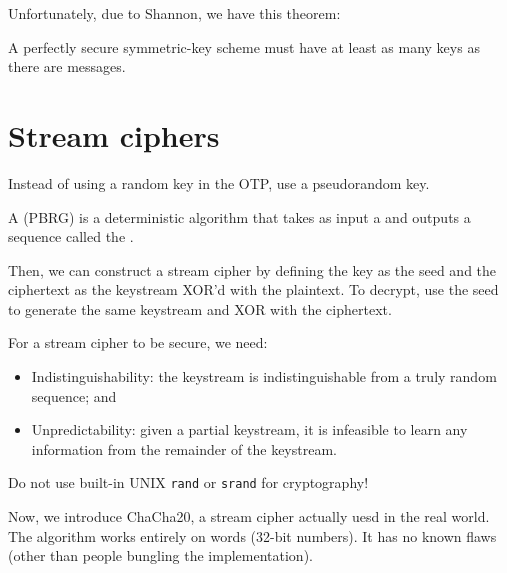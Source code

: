 \documentclass[class=co487,tikz,minted,notes]{agony}
\begin{document}
Unfortunately, due to Shannon, we have this theorem:

\begin{theorem}
  A perfectly secure symmetric-key scheme must have
  at least as many keys as there are messages.
\end{theorem}

\section{Stream ciphers}

Instead of using a random key in the OTP, use a pseudorandom key.

\begin{defn}[pseudorandomness]
  A  (PBRG) is a deterministic algorithm
  that takes as input a  and outputs a  sequence called
  the .
\end{defn}

Then, we can construct a stream cipher by defining the key as the seed
and the ciphertext as the keystream XOR'd with the plaintext.
To decrypt, use the seed to generate the same keystream and XOR with the ciphertext.

For a stream cipher to be secure, we need:
\begin{itemize}
  \item Indistinguishability: the keystream is indistinguishable from a
        truly random sequence; and
  \item Unpredictability: given a partial keystream, it is infeasible to learn
        any information from the remainder of the keystream.
\end{itemize}

\begin{remark}
  Do not use built-in UNIX \texttt{rand} or \texttt{srand} for cryptography!
\end{remark}

Now, we introduce ChaCha20, a stream cipher actually uesd in the real world.
The algorithm works entirely on words (32-bit numbers).
It has no known flaws (other than people bungling the implementation).
\end{document}
